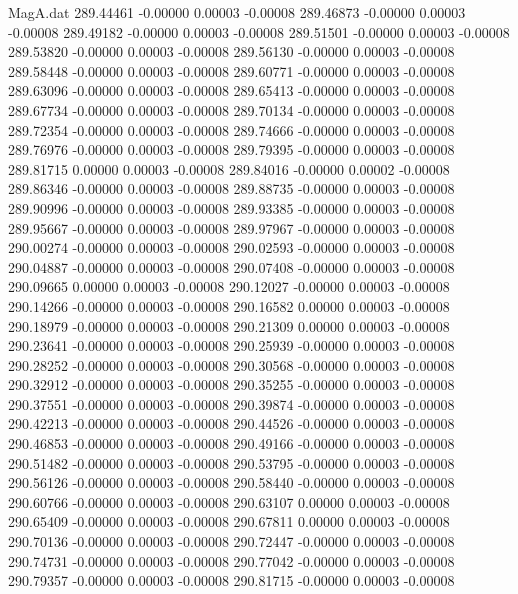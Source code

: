 \begin{filecontents}{MagA.dat}
 289.44461   -0.00000    0.00003   -0.00008
 289.46873   -0.00000    0.00003   -0.00008
 289.49182   -0.00000    0.00003   -0.00008
 289.51501   -0.00000    0.00003   -0.00008
 289.53820   -0.00000    0.00003   -0.00008
 289.56130   -0.00000    0.00003   -0.00008
 289.58448   -0.00000    0.00003   -0.00008
 289.60771   -0.00000    0.00003   -0.00008
 289.63096   -0.00000    0.00003   -0.00008
 289.65413   -0.00000    0.00003   -0.00008
 289.67734   -0.00000    0.00003   -0.00008
 289.70134   -0.00000    0.00003   -0.00008
 289.72354   -0.00000    0.00003   -0.00008
 289.74666   -0.00000    0.00003   -0.00008
 289.76976   -0.00000    0.00003   -0.00008
 289.79395   -0.00000    0.00003   -0.00008
 289.81715    0.00000    0.00003   -0.00008
 289.84016   -0.00000    0.00002   -0.00008
 289.86346   -0.00000    0.00003   -0.00008
 289.88735   -0.00000    0.00003   -0.00008
 289.90996   -0.00000    0.00003   -0.00008
 289.93385   -0.00000    0.00003   -0.00008
 289.95667   -0.00000    0.00003   -0.00008
 289.97967   -0.00000    0.00003   -0.00008
 290.00274   -0.00000    0.00003   -0.00008
 290.02593   -0.00000    0.00003   -0.00008
 290.04887   -0.00000    0.00003   -0.00008
 290.07408   -0.00000    0.00003   -0.00008
 290.09665    0.00000    0.00003   -0.00008
 290.12027   -0.00000    0.00003   -0.00008
 290.14266   -0.00000    0.00003   -0.00008
 290.16582    0.00000    0.00003   -0.00008
 290.18979   -0.00000    0.00003   -0.00008
 290.21309    0.00000    0.00003   -0.00008
 290.23641   -0.00000    0.00003   -0.00008
 290.25939   -0.00000    0.00003   -0.00008
 290.28252   -0.00000    0.00003   -0.00008
 290.30568   -0.00000    0.00003   -0.00008
 290.32912   -0.00000    0.00003   -0.00008
 290.35255   -0.00000    0.00003   -0.00008
 290.37551   -0.00000    0.00003   -0.00008
 290.39874   -0.00000    0.00003   -0.00008
 290.42213   -0.00000    0.00003   -0.00008
 290.44526   -0.00000    0.00003   -0.00008
 290.46853   -0.00000    0.00003   -0.00008
 290.49166   -0.00000    0.00003   -0.00008
 290.51482   -0.00000    0.00003   -0.00008
 290.53795   -0.00000    0.00003   -0.00008
 290.56126   -0.00000    0.00003   -0.00008
 290.58440   -0.00000    0.00003   -0.00008
 290.60766   -0.00000    0.00003   -0.00008
 290.63107    0.00000    0.00003   -0.00008
 290.65409   -0.00000    0.00003   -0.00008
 290.67811    0.00000    0.00003   -0.00008
 290.70136   -0.00000    0.00003   -0.00008
 290.72447   -0.00000    0.00003   -0.00008
 290.74731   -0.00000    0.00003   -0.00008
 290.77042   -0.00000    0.00003   -0.00008
 290.79357   -0.00000    0.00003   -0.00008
 290.81715   -0.00000    0.00003   -0.00008

\end{filecontents}
